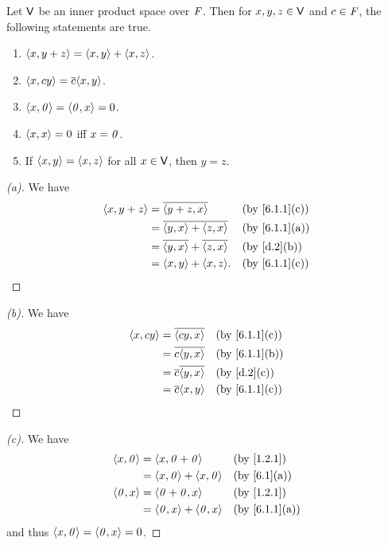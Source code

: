 \begin{thm}\label{6.1}
  Let \(\mathsf{V}\) be an inner product space over \(\mathit{F}\).
  Then for \(x, y, z \in \mathsf{V}\) and \(c \in \mathit{F}\), the following statements are true.
  \begin{enumerate}
    \item \(\left\langle x, y + z\right\rangle = \left\langle x, y\right\rangle + \left\langle x, z\right\rangle\).
    \item \(\inn{x, cy} = \conj{c} \inn{x, y}\).
    \item \(\left\langle x, \mathit{0}\right\rangle = \left\langle\mathit{0}, x\right\rangle = 0\).
    \item \(\left\langle x, x\right\rangle = 0\) iff \(x = \mathit{0}\).
    \item If \(\left\langle x, y\right\rangle = \left\langle x, z\right\rangle\) for all \(x \in \mathsf{V}\), then \(y = z\).
  \end{enumerate}
\end{thm}

\begin{proof}[(a)]
  We have
  \begin{align*}
    \inn{x, y + z} & = \conj{\inn{y + z, x}}                 &  & \by{6.1.1}[c] \\
                   & = \conj{\inn{y, x} + \inn{z, x}}        &  & \by{6.1.1}[a] \\
                   & = \conj{\inn{y, x}} + \conj{\inn{z, x}} &  & \by{d.2}[b]   \\
                   & = \inn{x, y} + \inn{x, z}.              &  & \by{6.1.1}[c]
  \end{align*}
\end{proof}

\begin{proof}[(b)]
  We have
  \begin{align*}
    \inn{x, cy} & = \conj{\inn{cy, x}}         &  & \by{6.1.1}[c] \\
                & = \conj{c \inn{y, x}}        &  & \by{6.1.1}[b] \\
                & = \conj{c} \conj{\inn{y, x}} &  & \by{d.2}[c]   \\
                & = \conj{c} \inn{x, y}        &  & \by{6.1.1}[c]
  \end{align*}
\end{proof}

\begin{proof}[(c)]
  We have
  \begin{align*}
    \inn{x, \zv} & = \inn{x, \zv + \zv}          &  & \by{1.2.1}    \\
                 & = \inn{x, \zv} + \inn{x, \zv} &  & \by{6.1}[a]   \\
    \inn{\zv, x} & = \inn{\zv + \zv, x}          &  & \by{1.2.1}    \\
                 & = \inn{\zv, x} + \inn{\zv, x} &  & \by{6.1.1}[a]
  \end{align*}
  and thus \(\left\langle x, \mathit{0}\right\rangle = \left\langle\mathit{0}, x\right\rangle = 0\).
\end{proof}

